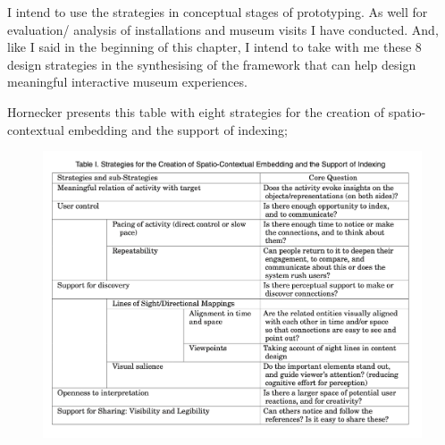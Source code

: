 I intend to use the strategies in conceptual stages of prototyping. As well for evaluation/ analysis of installations and museum visits I have conducted. And, like I said in the beginning of this chapter, I intend to take with me these 8 design strategies in the synthesising of the framework that can help design meaningful interactive museum experiences. 

Hornecker presents this table with eight strategies for the creation of spatio-contextual embedding and the support of indexing;

\begin{figure}[H]
\includegraphics[width=12cm]{pictures/strategies.png}
\centering 
\end{figure}